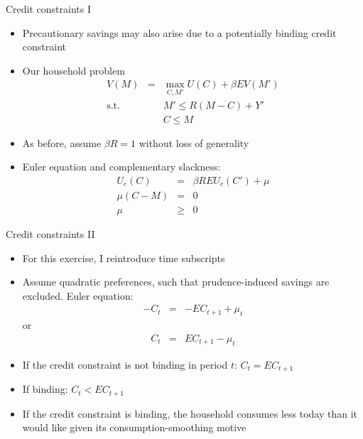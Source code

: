 \documentclass[9pt]{beamer}
\newcommand{\bit}{\begin{itemize}}
\newcommand{\eit}{\end{itemize}}
\newcommand{\bc}{\color{blue}}
\begin{document}
\begin{frame}{Credit constraints I}

\bit
\setlength\itemsep{1.5em}

\item Precautionary savings may also arise due to a {\bc potentially binding credit constraint}

\item Our household problem
\begin{eqnarray}
V(M) &=& \max_{C, M'} U(C) + \beta E V(M') \nonumber \\
\text{s.t.} && M' \leq R(M-C)+Y' \nonumber \\
&& C \leq M \nonumber
\end{eqnarray}

\item As before, assume $\beta R =1$ without loss of generality

\item Euler equation and complementary slackness:
\begin{eqnarray}
U_c(C) &=& \beta R  E U_c(C')  + \mu \nonumber \\
\mu(C-M) &=& 0 \nonumber \\
\mu &\geq& 0 \nonumber 
\end{eqnarray}


\eit

\end{frame}


\begin{frame}{Credit constraints II}

\bit
\setlength\itemsep{1.5em}

\item For this exercise, I reintroduce time subscripts

\item Assume quadratic preferences, such that prudence-induced savings are excluded. Euler equation:
\begin{eqnarray}
-C_{t} &=& -E C_{t+1} + \mu_t\nonumber 
\end{eqnarray}
or
\begin{eqnarray}
C_{t} &=& E C_{t+1} - \mu_t\nonumber 
\end{eqnarray}

\item If the credit constraint is not binding in period $t$: $C_{t} = E C_{t+1}$

\item If binding: $C_{t} < E C_{t+1}$

\item If the credit constraint is binding, the household consumes less today than it would like given its consumption-smoothing motive
\eit

\end{frame}
\end{document}
